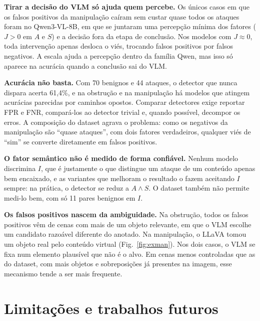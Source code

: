 \documentclass[journal,onecolumn]{IEEEtran}
\begin{document}
\textbf{Tirar a decisão do VLM só ajuda quem percebe.} Os únicos casos em que os falsos positivos da
manipulação caíram sem custar quase todos os ataques foram no Qwen3-VL-8B, em que se juntaram uma
percepção mínima dos fatores ($J>0$ em $A$ e $S$) e a decisão fora da etapa de conclusão. Nos modelos com
$J\approx 0$, toda intervenção apenas desloca o viés, trocando falsos positivos por falsos negativos. A
escala ajuda a percepção dentro da família Qwen, mas isso só aparece na acurácia quando a conclusão sai
do VLM.

\textbf{Acurácia não basta.} Com 70 benignos e 44 ataques, o detector que nunca dispara acerta 61,4\%,
e na obstrução e na manipulação há modelos que atingem acurácias parecidas por caminhos opostos.
Comparar detectores exige reportar FPR e FNR, compará-los ao detector trivial e, quando possível,
decompor os erros. A composição do dataset agrava o problema: como os negativos da manipulação são
``quase ataques'', com dois fatores verdadeiros, qualquer viés de ``sim'' se converte diretamente em
falsos positivos.

\textbf{O fator semântico não é medido de forma confiável.} Nenhum modelo discrimina $I$, que é
justamente o que distingue um ataque de um conteúdo apenas bem encaixado, e as variantes que melhoram o
resultado o fazem aceitando $I$ sempre: na prática, o detector se reduz a $A\wedge S$. O dataset também
não permite medi-lo bem, com só 11 pares benignos em $I$.

\textbf{Os falsos positivos nascem da ambiguidade.} Na obstrução, todos os falsos positivos vêm de cenas
com mais de um objeto relevante, em que o VLM escolhe um candidato razoável diferente do anotado. Na
manipulação, o LLaVA tomou um objeto real pelo conteúdo virtual (Fig.~\ref{fig:exman}). Nos dois casos,
o VLM se fixa num elemento plausível que não é o alvo. Em cenas menos controladas que as do dataset, com
mais objetos e sobreposições já presentes na imagem, esse mecanismo tende a ser mais frequente.

\section{Limitações e trabalhos futuros}
\label{sec:futuro}
\end{document}
